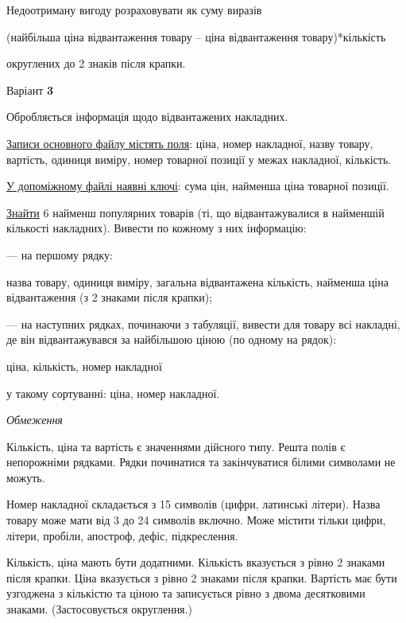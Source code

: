 \documentclass[11pt, ukrainian]{article}
\begin{document}
Недоотриману вигоду розраховувати як суму виразів
{\center (найбільша ціна відвантаження товару – ціна відвантаження товару)*кількість\par}

\bigskip
{\noindent} округлених до 2 знаків після крапки.


\par
\newpage
{\center Варіант  \No \textbf { 3 }\par}
\bigskip
Обробляється інформація щодо відвантажених накладних.

\underline{Записи основного файлу містять поля}: ціна, номер накладної, назву товару, вартість, одиниця виміру, номер товарної позиції у межах накладної, кількість.

\underline{У допоміжному файлі наявні ключі}: сума цін, найменша ціна товарної позиції.

\underline{Знайти} 6 найменш популярних товарів (ті, що відвантажувалися в найменшій кількості накладних). Вивести по кожному з них інформацію:\par
{\noindent}--- на першому рядку:\par
назва товару, одиниця виміру, загальна відвантажена кількість, найменша ціна відвантаження (з 2 знаками після крапки);

{\noindent}--- на наступних рядках, починаючи з табуляції, вивести для товару всі накладні, де він відвантажувався за найбільшою ціною (по одному на рядок):\par
ціна, кількість, номер накладної

{\noindent}у такому сортуванні: ціна, номер накладної.


\bigskip\textit{Обмеження}

Кількість, ціна та вартість є значеннями дійсного типу.
Решта полів є непорожніми рядками.
Рядки починатися та закінчуватися білими символами не можуть.

Номер накладної складається з 15 символів (цифри, латинські літери).
Назва товару може мати від 3 до 24 символів включно.
Може містити тільки цифри, літери, пробіли, апостроф, дефіс, підкреслення.

Кількість, ціна мають бути додатними.
Кількість вказується з рівно 2 знаками після крапки.
Ціна вказується з рівно 2 знаками після крапки.
Вартість має бути узгоджена з кількістю та ціною та записується рівно з двома десятковими знаками.
(Застосовується округлення.)
\end{document}
